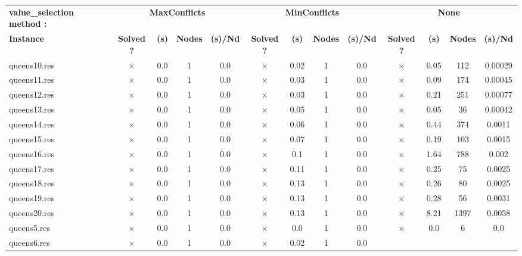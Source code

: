 \documentclass[main.tex]{subfiles}
\begin{document}
\thispagestyle{empty}

\begin{landscape}
\begin{center}
\renewcommand{\arraystretch}{1.4} 
\begin{tabular}{|l|cccc|cccc|cccc|}
	\hline
\textbf{value_selection method :} & \multicolumn{4}{c}{\textbf{MaxConflicts}} & \multicolumn{4}{c}{\textbf{MinConflicts}} & \multicolumn{4}{c}{\textbf{None}}\\
\textbf{Instance}  & \textbf{Solved ?} & \textbf{(s)} & \textbf{Nodes} & \textbf{(s)/Nd} & \textbf{Solved ?} & \textbf{(s)} & \textbf{Nodes} & \textbf{(s)/Nd} & \textbf{Solved ?} & \textbf{(s)} & \textbf{Nodes} & \textbf{(s)/Nd}\\\hline

queens10.res & $\times$ & 0.0 & 1 & 0.0
 & $\times$ & 0.02 & 1 & 0.0
 & $\times$ & 0.05 & 112 & 0.00029
\\
queens11.res & $\times$ & 0.0 & 1 & 0.0
 & $\times$ & 0.03 & 1 & 0.0
 & $\times$ & 0.09 & 174 & 0.00045
\\
queens12.res & $\times$ & 0.0 & 1 & 0.0
 & $\times$ & 0.03 & 1 & 0.0
 & $\times$ & 0.21 & 251 & 0.00077
\\
queens13.res & $\times$ & 0.0 & 1 & 0.0
 & $\times$ & 0.05 & 1 & 0.0
 & $\times$ & 0.05 & 36 & 0.00042
\\
queens14.res & $\times$ & 0.0 & 1 & 0.0
 & $\times$ & 0.06 & 1 & 0.0
 & $\times$ & 0.44 & 374 & 0.0011
\\
queens15.res & $\times$ & 0.0 & 1 & 0.0
 & $\times$ & 0.07 & 1 & 0.0
 & $\times$ & 0.19 & 103 & 0.0015
\\
queens16.res & $\times$ & 0.0 & 1 & 0.0
 & $\times$ & 0.1 & 1 & 0.0
 & $\times$ & 1.64 & 788 & 0.002
\\
queens17.res & $\times$ & 0.0 & 1 & 0.0
 & $\times$ & 0.11 & 1 & 0.0
 & $\times$ & 0.25 & 75 & 0.0025
\\
queens18.res & $\times$ & 0.0 & 1 & 0.0
 & $\times$ & 0.13 & 1 & 0.0
 & $\times$ & 0.26 & 80 & 0.0025
\\
queens19.res & $\times$ & 0.0 & 1 & 0.0
 & $\times$ & 0.13 & 1 & 0.0
 & $\times$ & 0.28 & 56 & 0.0031
\\
queens20.res & $\times$ & 0.0 & 1 & 0.0
 & $\times$ & 0.13 & 1 & 0.0
 & $\times$ & 8.21 & 1397 & 0.0058
\\
queens5.res & $\times$ & 0.0 & 1 & 0.0
 & $\times$ & 0.0 & 1 & 0.0
 & $\times$ & 0.0 & 6 & 0.0
\\
queens6.res & $\times$ & 0.0 & 1 & 0.0
 & $\times$ & 0.02 & 1 & 0.0

\end{tabular}
\end{center}
\end{landscape}
\end{document}
